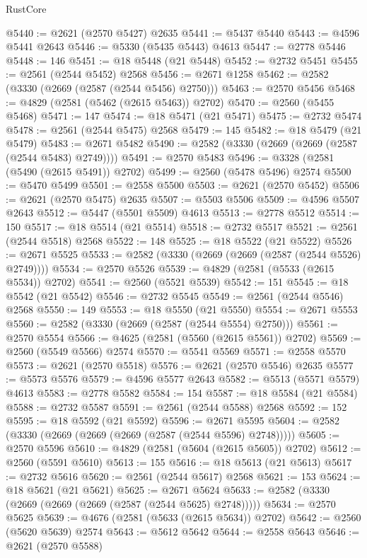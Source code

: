 \begin{lexlean}{RustCore}
\begin{coremodule}
@5440 := @2621 (@2570 @5427) @2635
@5441 := @5437 @5440
@5443 := @4596 @5441 @2643
@5446 := @5330 (@5435 @5443) @4613
@5447 := @2778 @5446
@5448 := 146
@5451 := @18 @5448 (@21 @5448)
@5452 := @2732 @5451
@5455 := @2561 (@2544 @5452) @2568
@5456 := @2671 @1258
@5462 := @2582 (@3330 (@2669 (@2587 (@2544 @5456) @2750)))
@5463 := @2570 @5456
@5468 := @4829 (@2581 (@5462 (@2615 @5463)) @2702)
@5470 := @2560 (@5455 @5468)
@5471 := 147
@5474 := @18 @5471 (@21 @5471)
@5475 := @2732 @5474
@5478 := @2561 (@2544 @5475) @2568
@5479 := 145
@5482 := @18 @5479 (@21 @5479)
@5483 := @2671 @5482
@5490 := @2582 (@3330 (@2669 (@2669 (@2587 (@2544 @5483) @2749))))
@5491 := @2570 @5483
@5496 := @3328 (@2581 (@5490 (@2615 @5491)) @2702)
@5499 := @2560 (@5478 @5496) @2574
@5500 := @5470 @5499
@5501 := @2558 @5500
@5503 := @2621 (@2570 @5452)
@5506 := @2621 (@2570 @5475) @2635
@5507 := @5503 @5506
@5509 := @4596 @5507 @2643
@5512 := @5447 (@5501 @5509) @4613
@5513 := @2778 @5512
@5514 := 150
@5517 := @18 @5514 (@21 @5514)
@5518 := @2732 @5517
@5521 := @2561 (@2544 @5518) @2568
@5522 := 148
@5525 := @18 @5522 (@21 @5522)
@5526 := @2671 @5525
@5533 := @2582 (@3330 (@2669 (@2669 (@2587 (@2544 @5526) @2749))))
@5534 := @2570 @5526
@5539 := @4829 (@2581 (@5533 (@2615 @5534)) @2702)
@5541 := @2560 (@5521 @5539)
@5542 := 151
@5545 := @18 @5542 (@21 @5542)
@5546 := @2732 @5545
@5549 := @2561 (@2544 @5546) @2568
@5550 := 149
@5553 := @18 @5550 (@21 @5550)
@5554 := @2671 @5553
@5560 := @2582 (@3330 (@2669 (@2587 (@2544 @5554) @2750)))
@5561 := @2570 @5554
@5566 := @4625 (@2581 (@5560 (@2615 @5561)) @2702)
@5569 := @2560 (@5549 @5566) @2574
@5570 := @5541 @5569
@5571 := @2558 @5570
@5573 := @2621 (@2570 @5518)
@5576 := @2621 (@2570 @5546) @2635
@5577 := @5573 @5576
@5579 := @4596 @5577 @2643
@5582 := @5513 (@5571 @5579) @4613
@5583 := @2778 @5582
@5584 := 154
@5587 := @18 @5584 (@21 @5584)
@5588 := @2732 @5587
@5591 := @2561 (@2544 @5588) @2568
@5592 := 152
@5595 := @18 @5592 (@21 @5592)
@5596 := @2671 @5595
@5604 := @2582 (@3330 (@2669 (@2669 (@2669 (@2587 (@2544 @5596) @2748)))))
@5605 := @2570 @5596
@5610 := @4829 (@2581 (@5604 (@2615 @5605)) @2702)
@5612 := @2560 (@5591 @5610)
@5613 := 155
@5616 := @18 @5613 (@21 @5613)
@5617 := @2732 @5616
@5620 := @2561 (@2544 @5617) @2568
@5621 := 153
@5624 := @18 @5621 (@21 @5621)
@5625 := @2671 @5624
@5633 := @2582 (@3330 (@2669 (@2669 (@2669 (@2587 (@2544 @5625) @2748)))))
@5634 := @2570 @5625
@5639 := @4676 (@2581 (@5633 (@2615 @5634)) @2702)
@5642 := @2560 (@5620 @5639) @2574
@5643 := @5612 @5642
@5644 := @2558 @5643
@5646 := @2621 (@2570 @5588)

\end{coremodule}
\end{lexlean}
